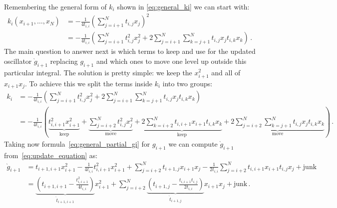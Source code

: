 \documentclass[a4paper,10pt]{article}
\begin{document}
Remembering the general form of $k_i$ shown in
\eqref{eq:general_ki} we can start with:
\begin{equation}
\begin{split}
  k_i(x_{i+1}, \ldots, x_N)
  & = - \frac{1}{4 t_{i,i}} {\left( \sum_{j=i+1}^{N} t_{i,j} x_j \right)}^2 \\
  & = - \frac{1}{4 t_{i,i}} \left( \sum_{j=i+1}^{N} t_{i,j}^2 x_j^2
                               + 2 \sum_{j=i+1}^{N} \sum_{k=j+1}^{N} t_{i,j} x_j t_{i,k} x_k
                            \right) \,.
\end{split}
\end{equation}
The main question to answer next is which terms to keep and use
for the updated oscillator $\grave{g}_{i+1}$ replacing $g_{i+1}$
and which ones to move one level up outside this particular integral.
The solution is pretty simple: we keep the $x_{i+1}^2$ and all of
$x_{i+1} x_j$. To achieve this we split the terms inside $k_i$
into two groups:
\begin{equation*}
\begin{split}
 k_i & = - \frac{1}{4 t_{i,i}}
         \left(
           \sum_{j=i+1}^{N} t_{i,j}^2 x_j^2
           + 2 \sum_{j=i+1}^{N} \sum_{k=j+1}^{N} t_{i,j} x_j t_{i,k} x_k
         \right) \\
     & = - \frac{1}{4 t_{i,i}}
         \left(
           \underbrace{t_{i,i+1}^2 x_{i+1}^2}_{\text{keep}}
           +
           \underbrace{\sum_{j=i+2}^{N} t_{i,j}^2 x_j^2}_{\text{move}}
           +
           \underbrace{2 \sum_{k=i+2}^{N} t_{i,i+1} x_{i+1} t_{i,k} x_k}_{\text{keep}}
           +
           \underbrace{2 \sum_{j=i+2}^{N} \sum_{k=j+1}^{N} t_{i,j} x_j t_{i,k} x_k}_{\text{move}}
         \right) \,.
\end{split}
\end{equation*}
Taking now formula~\eqref{eq:general_partial_gi} for $g_{i+1}$
we can compute $\grave{g}_{i+1}$ from~\eqref{eq:update_equation} as:
\begin{equation*}
\begin{split}
  \grave{g}_{i+1}
  & = t_{i+1,i+1} x_{i+1}^2 - \frac{1}{4 t_{i,i}} t_{i,i+1}^2 x_{i+1}^2
    + \sum_{j=i+2}^{N} t_{i+1,j} x_{i+1} x_j - \frac{1}{2 t_{i,i}} \sum_{j=i+2}^{N} t_{i,i+1} x_{i+1} t_{i,j} x_j
    + \text{junk} \\
  & = \underbrace{\left(t_{i+1,i+1} - \frac{t_{i,i+1}^2}{4 t_{i,i}}\right)}_{\grave{t}_{i+1,i+1}} x_{i+1}^2
    + \sum_{j=i+2}^{N} \underbrace{\left(t_{i+1,j} - \frac{t_{i,i+1} t_{i,j}}{2 t_{i,i}}\right)}_{\grave{t}_{i+1,j}} x_{i+1} x_j
    + \text{junk} \,.
\end{split}
\end{equation*}
\end{document}
